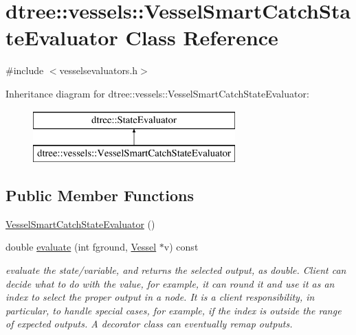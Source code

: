 \hypertarget{classdtree_1_1vessels_1_1_vessel_smart_catch_state_evaluator}{}\section{dtree\+::vessels\+::Vessel\+Smart\+Catch\+State\+Evaluator Class Reference}
\label{classdtree_1_1vessels_1_1_vessel_smart_catch_state_evaluator}


{\ttfamily \#include $<$vesselsevaluators.\+h$>$}

Inheritance diagram for dtree\+::vessels\+::Vessel\+Smart\+Catch\+State\+Evaluator\+:\begin{figure}[H]
\begin{center}
\leavevmode
\includegraphics[height=2.000000cm]{de/d99/classdtree_1_1vessels_1_1_vessel_smart_catch_state_evaluator}
\end{center}
\end{figure}
\subsection*{Public Member Functions}
\begin{DoxyCompactItemize}
\item 
\mbox{\hyperlink{classdtree_1_1vessels_1_1_vessel_smart_catch_state_evaluator_a20d811d8aed263ad5ce4be2137ebc850}{Vessel\+Smart\+Catch\+State\+Evaluator}} ()
\item 
double \mbox{\hyperlink{classdtree_1_1vessels_1_1_vessel_smart_catch_state_evaluator_a299f7b316ec87eec04189a486499d19f}{evaluate}} (int fground, \mbox{\hyperlink{class_vessel}{Vessel}} $\ast$v) const
\begin{DoxyCompactList}\small\item\em evaluate the state/variable, and returns the selected output, as double. Client can decide what to do with the value, for example, it can round it and use it as an index to select the proper output in a node. It is a client responsibility, in particular, to handle special cases, for example, if the index is outside the range of expected outputs. A decorator class can eventually remap outputs. \end{DoxyCompactList}\end{DoxyCompactItemize}


